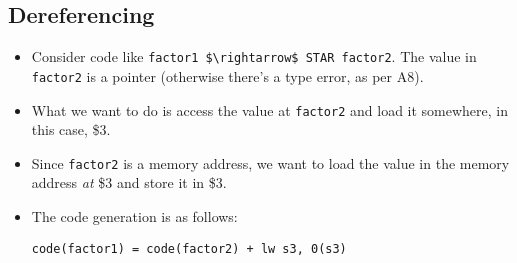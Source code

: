 \documentclass[12pt]{article}
\begin{document}
\begin{itemize}
        \subsection{Dereferencing}
        \begin{itemize}
            \item Consider code like \lstinline[mathescape]{factor1 $\rightarrow$ STAR factor2}.  The value in \lstinline[mathescape]{factor2} is a pointer (otherwise there's a type error, as per A8).
            \item What we want to do is access the value at \lstinline[mathescape]{factor2} and load it somewhere, in this case, \$3.  
            \item Since \lstinline[mathescape]{factor2} is a memory address, we want to load the value in the memory address \emph{at} \$3 and store it in \$3.
            \item The code generation is as follows:
\begin{lstlisting}[mathescape, numbers=none, breaklines=true]
code(factor1) = code(factor2) + lw s3, 0(s3)
\end{lstlisting}
        \end{itemize}
           

\end{itemize}
\end{document}
